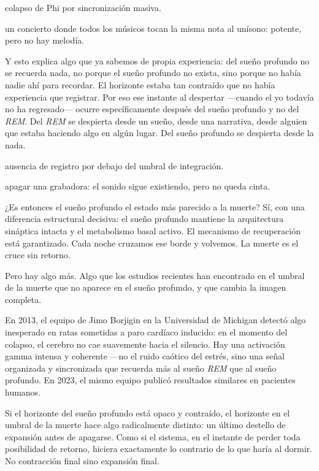 \begin{fisica}
 colapso de Phi por sincronización masiva.

 un concierto donde todos los músicos tocan la misma nota al unísono: potente, pero no hay melodía.
\end{fisica}
Y esto explica algo que ya sabemos de propia experiencia: del sueño profundo no se recuerda nada, no porque el sueño profundo no exista, sino porque no había nadie ahí para recordar. El horizonte estaba tan contraído que no había experiencia que registrar. Por eso ese instante al despertar —cuando el yo todavía no ha regresado— ocurre específicamente después del sueño profundo y no del \emph{REM}. Del \emph{REM} se despierta desde un sueño, desde una narrativa, desde alguien que estaba haciendo algo en algún lugar. Del sueño profundo se despierta desde la nada.

\begin{fisica}
 ausencia de registro por debajo del umbral de integración.

 apagar una grabadora: el sonido sigue existiendo, pero no queda cinta.
\end{fisica}
¿Es entonces el sueño profundo el estado más parecido a la muerte? Sí, con una diferencia estructural decisiva: el sueño profundo mantiene la arquitectura sináptica intacta y el metabolismo basal activo. El mecanismo de recuperación está garantizado. Cada noche cruzamos ese borde y volvemos. La muerte es el cruce sin retorno.

Pero hay algo más. Algo que los estudios recientes han encontrado en el umbral de la muerte que no aparece en el sueño profundo, y que cambia la imagen completa.

En 2013, el equipo de Jimo Borjigin en la Universidad de Michigan detectó algo inesperado en ratas sometidas a paro cardíaco inducido: en el momento del colapso, el cerebro no cae suavemente hacia el silencio. Hay una activación gamma intensa y coherente —no el ruido caótico del estrés, sino una señal organizada y sincronizada que recuerda más al sueño \emph{REM} que al sueño profundo. En 2023, el mismo equipo publicó resultados similares en pacientes humanos.

Si el horizonte del sueño profundo está opaco y contraído, el horizonte en el umbral de la muerte hace algo radicalmente distinto: un último destello de expansión antes de apagarse. Como si el sistema, en el instante de perder toda posibilidad de retorno, hiciera exactamente lo contrario de lo que haría al dormir. No contracción final sino expansión final.

